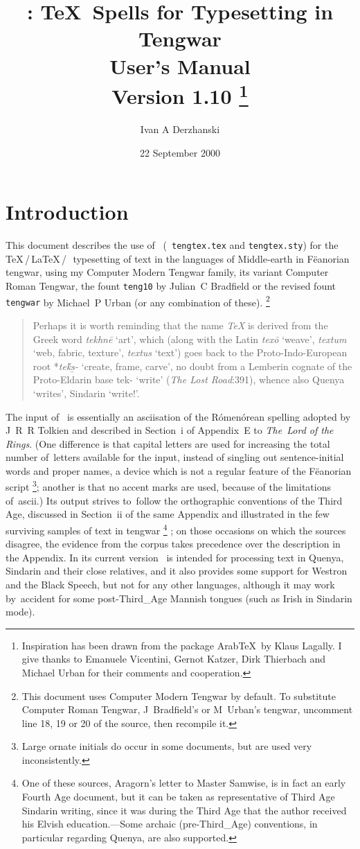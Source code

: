 \documentclass{article}
\title{\TengTeX: \TeX\ Spells for Typesetting in Tengwar\\
User's Manual\\ Version 1.10%
\thanks{Inspiration has been drawn from the package Arab\TeX\ by Klaus
  Lagally. I give thanks to Emanuele Vicentini, Gernot Katzer,
  Dirk Thierbach and Michael Urban for their comments and cooperation.}}
\author{Ivan A Derzhanski} \date{22 September 2000}
\newif \ifcmteng \cmtengtrue
\newcommand\book[1]{{\sl#1}\/}
\newcommand\word[1]{{\it#1}\/}
\newcommand\quet[1]{%
  \ifcmteng \underline {\quetta{#1}}\else \quetta{#1}\fi}
\begin{document}
\maketitle

\section{Introduction}

This document describes the use of \TengTeX\ ({\tt
  tengtex.tex} and {\tt tengtex.sty}) for the \TeX\,/\,\LaTeX\,/\,\LaTeXe\ 
typesetting of text in the languages of Middle-earth in F\"eanorian
tengwar, using my Computer Modern Tengwar family,
its variant Computer Roman Tengwar,
the fount {\tt teng10} by Julian~C Bradfield
or the revised fount {\tt tengwar} by Michael~P Urban
(or any combination of these).%
\footnote{This document uses Computer Modern Tengwar by default.
To substitute Computer Roman Tengwar, J~Bradfield's or M~Urban's tengwar,
uncomment line 18, 19 or 20 of the source, then recompile it.}
%
\begin{quote}
  Perhaps it is worth reminding that the name \word{\TeX} is derived
  from the Greek word \word{tekhn\=e} `art', which (along with the
  Latin \word{tex\=o} `weave', \word{textum} `web, fabric, texture',
  \word{textus} `text') goes back to the Proto-Indo-European root
  *\word{te\'k\b s-} `create, frame, carve', no doubt from a Lemberin
  cognate of the Proto-Eldarin base {\sc tek-} `write'
  (\book{The Lost Road}:391),
  whence also \quenya Quenya \quet{teke} `writes',
  \sindarin Sindarin \quet{teitho} `write!'.
\end{quote}
%
The input of \TengTeX\ is essentially an {\sc ascii}sation of the
R\'omen\'orean spelling adopted by J~R~R Tolkien and described in
Section~{\sc i} of Appendix~E to \book{The~Lord of the Rings}. (One
difference is that capital letters are used for increasing the total
number of~letters available for the input, instead of singling out
sentence-initial words and proper names, a device which is not
a regular feature of the F\"eanorian script%
\footnote{Large ornate initials do occur in some documents,
but are used very inconsistently.};
%
another is that no accent marks
are used, because of the limitations of~{\sc ascii}.)
Its output strives to~follow the orthographic conventions of the
Third Age, discussed in Section~{\sc ii} of the same Appendix and
illustrated in the few surviving samples of text in tengwar%
\footnote{One of these sources, Aragorn's letter to Master Samwise, is
  in fact an early Fourth Age document, but it can be taken as
  representative of Third Age Sindarin writing, since it was during
  the Third Age that the author received his Elvish education.---Some
  archaic (pre-Third\_Age) conventions, in particular regarding
  Quenya, are also supported.}%
; on those occasions on which the sources disagree, the evidence from
the corpus takes precedence over the description in the Appendix. In
its current version \TengTeX\ is intended for processing text in
Quenya, Sindarin and their close relatives, and it also provides some
support for Westron and the Black Speech, but not for any other
languages, although it may work by~accident for some post-Third\_Age
Mannish tongues (such as Irish in Sindarin mode).
\end{document}
